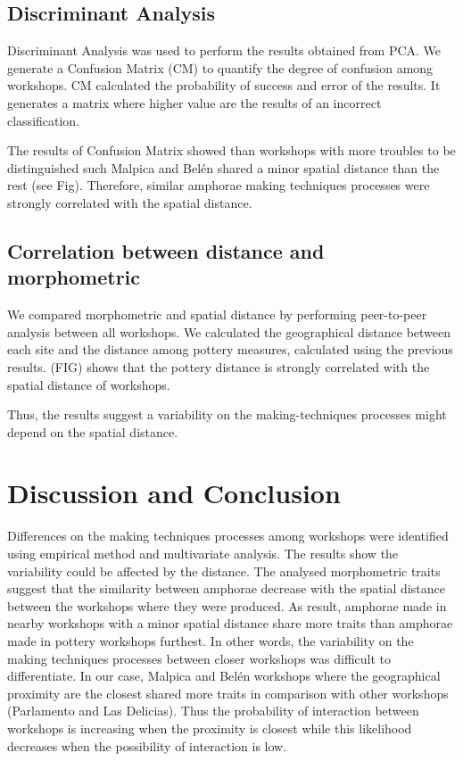 \documentclass[review]{elsarticle}
\begin{document}
\subsection{Discriminant Analysis}


Discriminant Analysis was used to perform the results obtained from PCA. We generate a Confusion Matrix (CM) to quantify the degree of confusion among workshops. CM calculated the probability of success and error of the results. It generates a matrix where higher value are the results of an incorrect classification. 

The results of Confusion Matrix showed than workshops with more troubles to be distinguished such Malpica and Bel\'en shared a minor spatial distance than the rest (see Fig). Therefore, similar amphorae making techniques processes were strongly correlated with the spatial distance. 


\subsection{Correlation between distance and morphometric}

We compared morphometric and spatial distance by performing peer-to-peer analysis between all workshops. We calculated the geographical distance between each site and the distance among pottery measures, calculated using the previous results. (FIG) shows that the pottery distance is strongly correlated with the spatial distance of workshops.



Thus, the results suggest a variability on the making-techniques processes might depend on the spatial distance.  

\section{Discussion and Conclusion}


Differences on the making techniques processes among workshops were identified using empirical method and multivariate analysis. The results show the variability could be affected by the distance. The analysed morphometric traits suggest that the similarity between amphorae decrease with the spatial distance between the workshops where they were produced. As result, amphorae made in nearby workshops with a minor spatial distance share more traits than amphorae made in pottery workshops furthest. In other words, the variability on the making techniques processes between closer workshops was difficult to differentiate. In our case, Malpica and Bel\'en workshops where the geographical proximity are the closest shared more traits in comparison with other workshops (Parlamento and Las Delicias). Thus the probability of interaction between workshops is increasing when the proximity is closest while this likelihood decreases when the possibility of interaction is low. 
\end{document}
